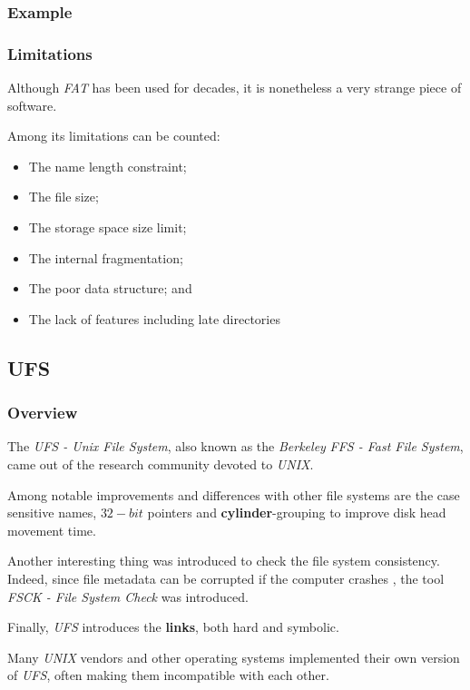 \begin{frame}
  \frametitle{Example}

  \begin{center}
  \end{center}
\end{frame}


\begin{frame}
  \frametitle{Limitations}

  Although \textit{FAT} has been used for decades, it is nonetheless a
  very strange piece of software.

  \-

  Among its limitations can be counted:

  \begin{itemize}
    \item
      The name length constraint;
    \item
      The file size;
    \item
      The storage space size limit;
    \item
      The internal fragmentation;
    \item
      The poor data structure; and
    \item
      The lack of features including late directories \etc{}
  \end{itemize}
\end{frame}


\subsection{UFS}


\begin{frame}
  \frametitle{Overview}

  The \textit{UFS - Unix File System}, also known as the \textit{Berkeley}
  \textit{FFS - Fast File System}, came out of the research community devoted
  to \textit{UNIX}.

  \-

  Among notable improvements and differences with other file systems are
  the case sensitive names, $32-bit$ pointers and \textbf{cylinder}-grouping
  to improve disk head movement time.

  \-

  Another interesting thing was introduced to check the file system
  consistency. Indeed, since file metadata can be corrupted if the computer
  crashes \etc{}, the tool \textit{FSCK - File System Check} was introduced.

  \-

  Finally, \textit{UFS} introduces the \textbf{links}, both hard and symbolic.

  \-

  Many \textit{UNIX} vendors and other operating systems implemented their
  own version of \textit{UFS}, often making them incompatible with each
  other.
\end{frame}

